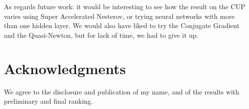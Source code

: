 \documentclass[11pt]{article}
\begin{document}
As regards future work: it would be interesting to see how the result on the CUP varies using Super Accelerated Nesterov, or trying neural networks with more than one hidden layer. We would also have liked to try the Conjugate Gradient and the Quasi-Newton, but for lack of time, we had to give it up.

\section*{Acknowledgments}
We agree to the disclosure and publication of my name, and of the results with preliminary and final ranking. 
 


\end{document}
